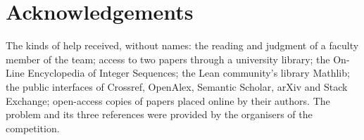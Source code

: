 \documentclass[11pt]{article}
\theoremstyle{definition}
\theoremstyle{remark}
\numberwithin{equation}{section}
\numberwithin{figure}{section}
\begin{document}
\section*{Acknowledgements}
The kinds of help received, without names: the reading and judgment of a faculty member of the team; access
to two papers through a university library; the On-Line Encyclopedia of Integer Sequences; the Lean
community's library Mathlib; the public interfaces of Crossref, OpenAlex, Semantic Scholar, arXiv and Stack
Exchange; open-access copies of papers placed online by their authors. The problem and its three references
were provided by the organisers of the competition.


\end{document}
